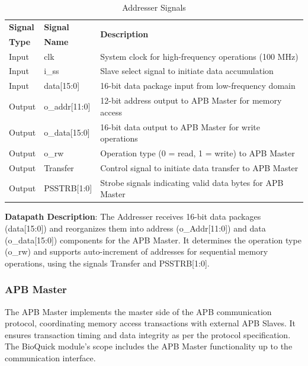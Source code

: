 \begin{table}[!htb]
    \centering
    \caption{Addresser Signals}
    \label{tab:addresser-signals}
    \begin{tabular}{|m{}|m{}|m{}|}
        \hline
        \textbf{Signal} & \textbf{Signal} & \multirow{2}{*}{\textbf{Description}} \\
        \textbf{Type} & \textbf{Name} & \\
        \hline
        Input & clk & System clock for high-frequency operations (100 MHz) \\
        Input & i\_ss & Slave select signal to initiate data accumulation \\
        Input & data[15:0] & 16-bit data package input from low-frequency domain \\
        Output & o\_addr[11:0] & 12-bit address output to APB Master for memory access \\
        Output & o\_data[15:0] & 16-bit data output to APB Master for write operations \\
        Output & o\_rw & Operation type (0 = read, 1 = write) to APB Master \\
        Output & Transfer & Control signal to initiate data transfer to APB Master \\
        Output & PSSTRB[1:0] & Strobe signals indicating valid data bytes for APB Master \\
        \hline
    \end{tabular}
\end{table}

\textbf{Datapath Description}: The Addresser receives 16-bit data packages (data[15:0]) and reorganizes them into address (o\_Addr[11:0]) and data (o\_data[15:0]) components for the APB Master. It determines the operation type (o\_rw) and supports auto-increment of addresses for sequential memory operations, using the signals Transfer and PSSTRB[1:0].

\subsubsection{APB Master}
The APB Master implements the master side of the APB communication protocol, coordinating memory access transactions with external APB Slaves. It ensures transaction timing and data integrity as per the protocol specification. The BioQuick module's scope includes the APB Master functionality up to the communication interface.

